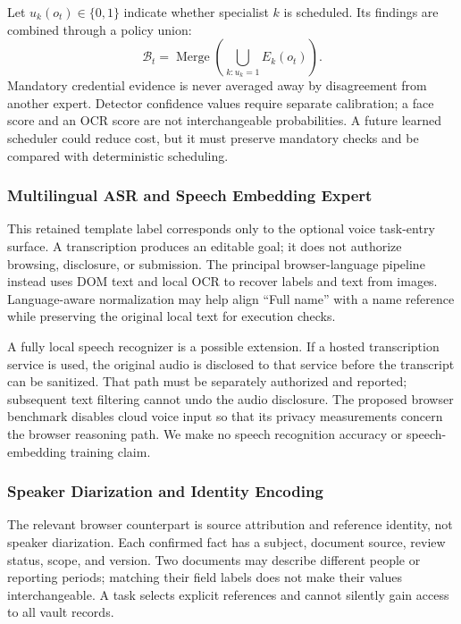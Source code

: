 \documentclass[conference]{IEEEtran}
\begin{document}
Let $u_k(o_t)\in\{0,1\}$ indicate whether specialist $k$ is scheduled. Its findings are combined through a policy union:
\begin{equation}
 \mathcal{B}_t=\operatorname{Merge}\!\left(\bigcup_{k:u_k=1}E_k(o_t)\right).
\end{equation}
Mandatory credential evidence is never averaged away by disagreement from another expert. Detector confidence values require separate calibration; a face score and an OCR score are not interchangeable probabilities. A future learned scheduler could reduce cost, but it must preserve mandatory checks and be compared with deterministic scheduling.

\subsubsection{Multilingual ASR and Speech Embedding Expert}
This retained template label corresponds only to the optional voice task-entry surface. A transcription produces an editable goal; it does not authorize browsing, disclosure, or submission. The principal browser-language pipeline instead uses DOM text and local OCR to recover labels and text from images. Language-aware normalization may help align ``Full name'' with a name reference while preserving the original local text for execution checks.

A fully local speech recognizer is a possible extension. If a hosted transcription service is used, the original audio is disclosed to that service before the transcript can be sanitized. That path must be separately authorized and reported; subsequent text filtering cannot undo the audio disclosure. The proposed browser benchmark disables cloud voice input so that its privacy measurements concern the browser reasoning path. We make no speech recognition accuracy or speech-embedding training claim.

\subsubsection{Speaker Diarization and Identity Encoding}
The relevant browser counterpart is source attribution and reference identity, not speaker diarization. Each confirmed fact has a subject, document source, review status, scope, and version. Two documents may describe different people or reporting periods; matching their field labels does not make their values interchangeable. A task selects explicit references and cannot silently gain access to all vault records.
\end{document}
